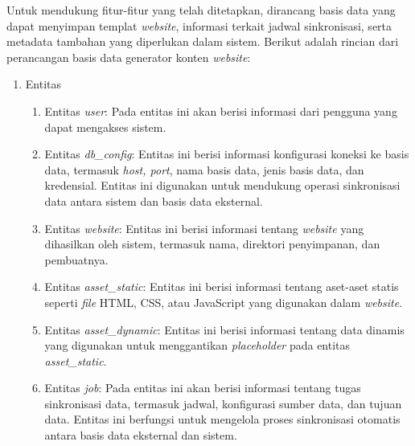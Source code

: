 Untuk mendukung fitur-fitur yang telah ditetapkan, dirancang basis data yang dapat menyimpan templat \textit{website}, informasi terkait jadwal sinkronisasi, serta metadata tambahan yang diperlukan dalam sistem. Berikut adalah rincian dari perancangan basis data generator konten \textit{website}:
\begin{enumerate}[label*=\arabic*.,ref=\arabic*]
    \item Entitas
    \begin{enumerate}[label=\arabic*.]
        \item Entitas \textit{user}: Pada entitas ini akan berisi informasi dari pengguna yang dapat mengakses sistem.

        \item Entitas \textit{db\_config}: Entitas ini berisi informasi konfigurasi koneksi ke basis data, termasuk \textit{host, port}, nama basis data, jenis basis data, dan kredensial. Entitas ini digunakan untuk mendukung operasi sinkronisasi data antara sistem dan basis data eksternal.

        \item Entitas \textit{website}: Entitas ini berisi informasi tentang \textit{website} yang dihasilkan oleh sistem, termasuk nama, direktori penyimpanan, dan pembuatnya.

        \item Entitas \textit{asset\_static}: Entitas ini berisi informasi tentang aset-aset statis seperti \textit{file} HTML, CSS, atau JavaScript yang digunakan dalam \textit{website}.

        \item Entitas \textit{asset\_dynamic}: Entitas ini berisi informasi tentang data dinamis yang digunakan untuk menggantikan \textit{placeholder} pada entitas \textit{asset\_static}.

        \item Entitas \textit{job}: Pada entitas ini akan berisi informasi tentang tugas sinkronisasi data, termasuk jadwal, konfigurasi sumber data, dan tujuan data. Entitas ini berfungsi untuk mengelola proses sinkronisasi otomatis antara basis data eksternal dan sistem.

    \end{enumerate}



\end{enumerate}
